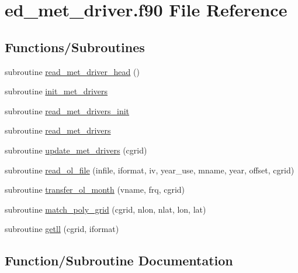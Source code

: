 \hypertarget{ed__met__driver_8f90}{}\section{ed\+\_\+met\+\_\+driver.\+f90 File Reference}
\label{ed__met__driver_8f90}
\subsection*{Functions/\+Subroutines}
\begin{DoxyCompactItemize}
\item 
subroutine \hyperlink{ed__met__driver_8f90_aaac32069d2a1755b7c28d9fb6dfa46b5}{read\+\_\+met\+\_\+driver\+\_\+head} ()
\item 
subroutine \hyperlink{ed__met__driver_8f90_af374ae80eae6cc36ba0b929cb3331dd6}{init\+\_\+met\+\_\+drivers}
\item 
subroutine \hyperlink{ed__met__driver_8f90_ae08362e245fc684cc25b6da9753d7e8d}{read\+\_\+met\+\_\+drivers\+\_\+init}
\item 
subroutine \hyperlink{ed__met__driver_8f90_a7d4297b01884de8f2e6600b55237abe3}{read\+\_\+met\+\_\+drivers}
\item 
subroutine \hyperlink{ed__met__driver_8f90_a733afbe45244033876caaa6e09cb053c}{update\+\_\+met\+\_\+drivers} (cgrid)
\item 
subroutine \hyperlink{ed__met__driver_8f90_a34eab0172f052f94967db76f5759f3af}{read\+\_\+ol\+\_\+file} (infile, iformat, iv, year\+\_\+use, mname, year, offset, cgrid)
\item 
subroutine \hyperlink{ed__met__driver_8f90_a82a398380568058329f47b2ef8c7687a}{transfer\+\_\+ol\+\_\+month} (vname, frq, cgrid)
\item 
subroutine \hyperlink{ed__met__driver_8f90_aaa95caccc923f7929434fdb91215b1d5}{match\+\_\+poly\+\_\+grid} (cgrid, nlon, nlat, lon, lat)
\item 
subroutine \hyperlink{ed__met__driver_8f90_ae10e80f54928f80aa87823047476779e}{getll} (cgrid, iformat)
\end{DoxyCompactItemize}


\subsection{Function/\+Subroutine Documentation}
